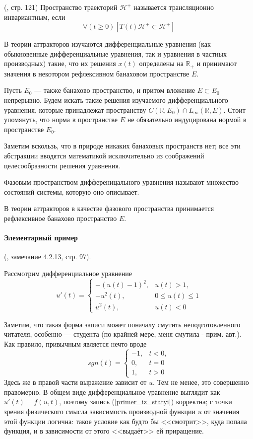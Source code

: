 \opred (\cite{Zelenaya}, стр. 121)
Пространство траекторий $\mathcal{H}^+$ называется трансляционно инвариантным, если
$$
\forall(t \geq 0)\left[T(t)\mathcal{H}^+ \subset \mathcal{H}^+ \right]
$$


В теории аттракторов изучаются дифференциальные уравнения (как обыкновенные дифференциальные уравнения, так и уравнения в частных производных) такие, что их решения $x(t)$ определены на $\mathbb{R}_+$ и принимают значения в некотором рефлексивном банаховом пространстве $E$.

Пусть $E_0$ --- также банахово пространство, и притом вложение $E \subset E_0$ непрерывно.
Будем искать такие решения изучаемого дифференциального уравнения, которые принадлежат пространству $C(\mathbb{R},E_0) \cap L_\infty(\mathbb{R},E)$.
Стоит упомянуть, что норма в пространстве $E$ не обязательно индуцирована нормой в пространстве $E_0$.

Заметим вскользь, что в природе никаких банаховых пространств нет; все эти абстракции вводятся математикой исключительно из соображений целесообразности решения уравнения.

\opred
Фазовым пространством дифференицального уравнения называют множество состояний системы, которую оно описывает.

В теории аттракторов в качестве фазового пространства принимается рефлексивное банахово пространство $E$.


\paragraph{Элементарный пример} (\cite{Vorotnikov}, замечание 4.2.13, стр. 97).

Рассмотрим дифференциальное уравнение
\begin{equation}\label{primer_iz_statyi}
	u'(t)=
	\left\{
		\begin{array}{ll}
			-(u(t)-1)^2, & u(t) > 1, \\
			-u^2 (t)   , & 0 \leq u(t) \leq 1 \\
			u^2 (t)    , & u(t) < 0
		\end{array}
	\right.
\end{equation}

Заметим, что такая форма записи может поначалу смутить неподготовленного читателя, особенно --- студента (по крайней мере, меня смутила - прим. авт.).
Как правило, привычным является нечто вроде
\begin{equation*}
	sgn(t)=
	\left\{
		\begin{array}{ll}
			-1, & t < 0, \\
			 0, & t = 0 \\
			 1, & t > 0
		\end{array}
	\right.
\end{equation*}
Здесь же в правой части выражение зависит от $u$.
Тем не менее, это совершенно правомерно.
В общем виде дифференциальное уравнение выглядит как $u'(t)=f(u,t)$,
поэтому запись (\ref{primer_iz_statyi}) корректна;
с точки зрения физического смысла зависимость производной функции $u$ от значения этой функции логична:
такое условие как будто бы <<смотрит>>, куда попала функция, и в зависимости от этого <<выдаёт>> ей приращение.


